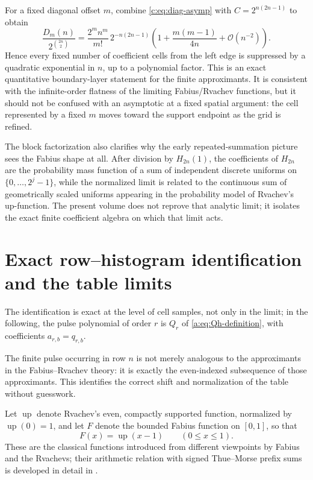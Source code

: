 \documentclass[11pt,a4paper,oneside,openany]{book}
\numberwithin{equation}{chapter}
\theoremstyle{definition}
\theoremstyle{remark}
\newcommand{\bigO}{\mathcal O}
\newcommand{\Diag}{D}
\newcommand{\Up}{\operatorname{up}}
\begin{document}
For a fixed diagonal offset $m$, combine \eqref{c:eq:diag-asymp} with
$C=2^{n(2n-1)}$ to obtain
\begin{equation}
 \frac{\Diag_m(n)}{2^{\binom{2n}{2}}}
 =\frac{2^mn^m}{m!}\,2^{-n(2n-1)}
 \left(1+\frac{m(m-1)}{4n}+\bigO(n^{-2})\right).
 \label{b:eq:normalized-diagonal-asymptotic}
\end{equation}
Hence every fixed number of coefficient cells from the left edge is
suppressed by a quadratic exponential in $n$, up to a polynomial factor.
This is an exact quantitative boundary-layer statement for the finite
approximants.  It is consistent with the infinite-order flatness of the
limiting Fabius/Rvachev functions, but it should not be confused with an
asymptotic at a fixed spatial argument: the cell represented by a fixed $m$
moves toward the support endpoint as the grid is refined.

The block factorization also clarifies why the early repeated-summation
picture sees the Fabius shape at all.  After division by $H_{2n}(1)$, the coefficients of $H_{2n}$ are the
probability mass function of a sum of independent discrete uniforms on
$\{0,\ldots,2^j-1\}$, while the normalized limit is related to the continuous
sum of geometrically scaled uniforms appearing in the probability model of
Rvachev's up-function.  The present volume does not reprove that analytic
limit; it isolates the exact finite coefficient algebra on which that limit
acts.

\section{Exact row--histogram identification and the table limits}
The identification is exact at the level of cell samples, not only in the
limit; in the following, the pulse polynomial of order $r$ is $Q_r$ of
\eqref{a:eq:Qh-definition}, with coefficients $a_{r,b}=q_{r,b}$.

The finite pulse occurring in row \(n\) is not merely analogous to the
approximants in the Fabius--Rvachev theory: it is exactly the even-indexed
subsequence of those approximants.  This identifies the correct shift and
normalization of the table without guesswork.

Let \(\Up\) denote Rvachev's even, compactly supported function, normalized
by \(\Up(0)=1\), and let \(F\) denote the bounded Fabius function on
\([0,1]\), so that
\begin{equation}
 F(x)=\Up(x-1)\qquad(0\leq x\leq1).                       \label{c:eq:F-up}
\end{equation}
These are the classical functions introduced from different viewpoints by
Fabius and the Rvachevs; their arithmetic relation with signed Thue--Morse
prefix sums is developed in detail in \cite{fabius,rvachev1971,arias2018,proveit}.
\end{document}
